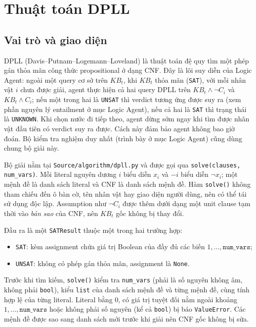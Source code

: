 \section{Thuật toán DPLL}
\label{sec:dpll}

\subsection{Vai trò và giao diện}
DPLL (Davis--Putnam--Logemann--Loveland) là thuật toán đệ quy tìm một phép
gán thỏa mãn công thức propositional ở dạng CNF. Đây là lõi suy diễn của
Logic Agent: ngoài một query cơ sở trên $KB_t$, khi $KB_t$ thỏa mãn
(\texttt{SAT}), với mỗi nhân vật $i$ chưa được giải, agent thực hiện cả hai
query DPLL trên $KB_t\wedge\neg C_i$ và $KB_t\wedge C_i$; nếu một trong hai
là \texttt{UNSAT} thì verdict tương ứng được suy ra (xem phần nguyên lý
entailment ở mục Logic Agent), nếu cả hai là \texttt{SAT} thì trạng thái là
\texttt{UNKNOWN}. Khi chọn nước đi tiếp theo, agent dừng sớm ngay khi tìm
được nhân vật đầu tiên có verdict suy ra được. Cách này đảm bảo agent không
bao giờ đoán. Bộ kiểm tra nghiệm duy nhất (trình bày ở mục Logic Agent) cũng
dùng chung bộ giải này.

Bộ giải nằm tại \texttt{Source/algorithm/dpll.py} và được gọi qua
\texttt{solve(clauses, num\_vars)}. Mỗi literal nguyên dương $i$ biểu diễn
$x_i$ và $-i$ biểu diễn $\neg x_i$; một mệnh đề là danh sách literal và CNF
là danh sách mệnh đề. Hàm \texttt{solve()} không tham chiếu đến ô bàn cờ,
tên nhân vật hay giao diện người dùng, nên có thể tái sử dụng độc lập.
Assumption như $\neg C_i$ được thêm dưới dạng một unit clause tạm thời vào
\emph{bản sao} của CNF, nên $KB_t$ gốc không bị thay đổi.

Đầu ra là một \texttt{SATResult} thuộc một trong hai trường hợp:
\begin{itemize}
    \item \texttt{SAT}: kèm assignment chứa giá trị Boolean của đầy đủ các
    biến $1,\ldots,\texttt{num\_vars}$;
    \item \texttt{UNSAT}: không có phép gán thỏa mãn, assignment là
    \texttt{None}.
\end{itemize}
Trước khi tìm kiếm, \texttt{solve()} kiểm tra \texttt{num\_vars} (phải là số
nguyên không âm, không phải \texttt{bool}), kiểu \texttt{list} của danh sách
mệnh đề và từng mệnh đề, cùng tính hợp lệ của từng literal. Literal bằng $0$,
có giá trị tuyệt đối nằm ngoài khoảng $1,\ldots,\texttt{num\_vars}$ hoặc
không phải số nguyên (kể cả \texttt{bool}) bị báo \texttt{ValueError}. Các
mệnh đề được sao sang danh sách mới trước khi giải nên CNF gốc không bị sửa.

